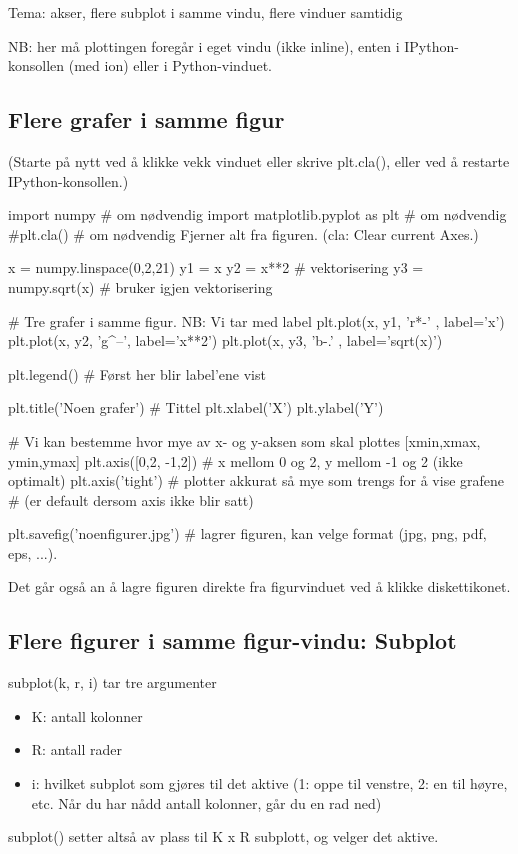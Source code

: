 Tema: akser, flere subplot i samme vindu, flere vinduer samtidig 

NB: her må plottingen foregår i eget vindu (ikke inline), enten i IPython-konsollen (med ion) eller i Python-vinduet. 

\subsection{Flere grafer i samme figur}

(Starte på nytt ved å klikke vekk vinduet eller skrive plt.cla(), eller ved å restarte IPython-konsollen.) 

\begin{usncodebox}
import numpy                        # om nødvendig
import matplotlib.pyplot as plt     # om nødvendig
#plt.cla()                          # om nødvendig  Fjerner alt fra figuren. (cla: Clear current Axes.) 

x = numpy.linspace(0,2,21)
y1 = x
y2 = x**2                 # vektorisering 
y3 = numpy.sqrt(x)        # bruker igjen vektorisering

# Tre grafer i samme figur. NB: Vi tar med label
plt.plot(x, y1, 'r*-' , label='x')
plt.plot(x, y2, 'g^--', label='x**2')
plt.plot(x, y3, 'b-.' , label='sqrt(x)') 

plt.legend()    # Først her blir label'ene vist 

plt.title('Noen grafer')  # Tittel
plt.xlabel('X') 
plt.ylabel('Y')

# Vi kan bestemme hvor mye av x- og y-aksen som skal plottes [xmin,xmax, ymin,ymax]
plt.axis([0,2, -1,2])     # x mellom 0 og 2, y mellom -1 og 2  (ikke optimalt)
plt.axis('tight')         # plotter akkurat så mye som trengs for å vise grafene 
                          # (er default dersom axis ikke blir satt)
 
plt.savefig('noenfigurer.jpg')  # lagrer figuren, kan velge format (jpg, png, pdf, eps, ...). 
\end{usncodebox}

Det går også an å lagre figuren direkte fra figurvinduet ved å klikke diskettikonet. 

\subsection{Flere figurer i samme figur-vindu: Subplot}

subplot(k, r, i) tar tre argumenter
\begin{itemize}
\item K: antall kolonner 
\item R: antall rader
\item i: hvilket subplot som gjøres til det aktive (1: oppe til venstre, 2: en til høyre, etc. Når du har nådd antall kolonner, går du en rad ned)
\end{itemize}
subplot() setter altså av plass til K x R subplott, og velger det aktive.

